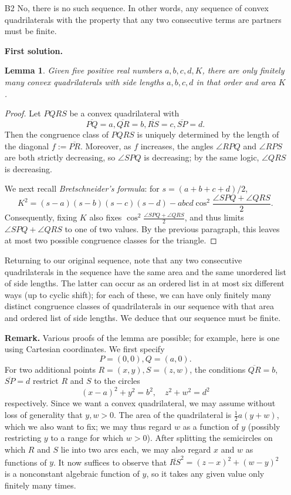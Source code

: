 \documentclass[amssymb,twocolumn,pra,10pt,aps]{revtex4-1}
\newtheorem*{lemma*}{Lemma}
\begin{document}
\begin{itemize}
\item[B2]
No, there is no such sequence. In other words, any sequence of convex quadrilaterals with the property that any two consecutive terms are partners must be finite.

\noindent
\textbf{First solution.}

\begin{lemma*}
Given five positive real numbers $a,b,c,d,K$, there are only finitely many convex quadrilaterals with side lengths $a,b,c,d$ in that order and area $K$. 
\end{lemma*}
\begin{proof}
Let $PQRS$ be a convex quadrilateral with 
\[
\overline{PQ} = a, \overline{QR} = b, \overline{RS} = c, \overline{SP} = d.
\]
Then the congruence class of $PQRS$ is uniquely determined by the length of the diagonal $f := \overline{PR}$.
Moreover, as $f$ increases, the angles $\angle RPQ$ and $\angle RPS$ are both strictly decreasing, so $\angle SPQ$ is decreasing; by the same logic, $\angle QRS$ is decreasing. 

We next recall \emph{Bretschneider's formula}: for $s = (a+b+c+d)/2$,
\[
K^2 = (s-a)(s-b)(s-c)(s-d) - abcd \cos^2 \frac{\angle SPQ + \angle QRS}{2}.
\]
Consequently, fixing $K$ also fixes $\cos^2 \frac{\angle SPQ + \angle QRS}{2}$,
and thus limits $\angle SPQ + \angle QRS$ to one of two values. By the previous paragraph, this leaves at most two possible congruence classes for the triangle.
\end{proof}

Returning to our original sequence, note that any two consecutive quadrilaterals in the sequence have the same area and the same unordered list of side lengths. The latter can occur as an ordered list in at most six different ways (up to cyclic shift); for each of these, we can have only finitely many distinct congruence classes of quadrilaterals in our sequence with that area and ordered list of side lengths. We deduce that our sequence must be finite.

\noindent
\textbf{Remark.}
Various proofs of the lemma are possible; for example, here is one using Cartesian coordinates. We 
first specify 
\[
P = (0,0), Q = (a, 0).
\]
For two additional points $R = (x,y),S = (z,w)$, the conditions $\overline{QR} = b$, $\overline{SP} = d$ restrict $R$ and $S$ to the circles
\[
(x-a)^2 + y^2 = b^2, \quad
z^2+w^2 = d^2
\]
respectively. Since we want a convex quadrilateral, we may assume without loss of generality that $y,w > 0$.
The area of the quadrilateral is $\frac{1}{2} a(y+w)$, which we also want to fix; we may thus regard $w$ as a function of $y$ (possibly restricting $y$ to a range for which $w>0$). After splitting the semicircles on which $R$ and $S$ lie into two arcs each, we may also regard $x$ and $w$ as functions of $y$. It now suffices to observe that $\overline{RS}^2 = (z-x)^2 + (w-y)^2$
is a nonconstant algebraic function of $y$, so it takes any given value only finitely many times.


\end{itemize}
\end{document}
